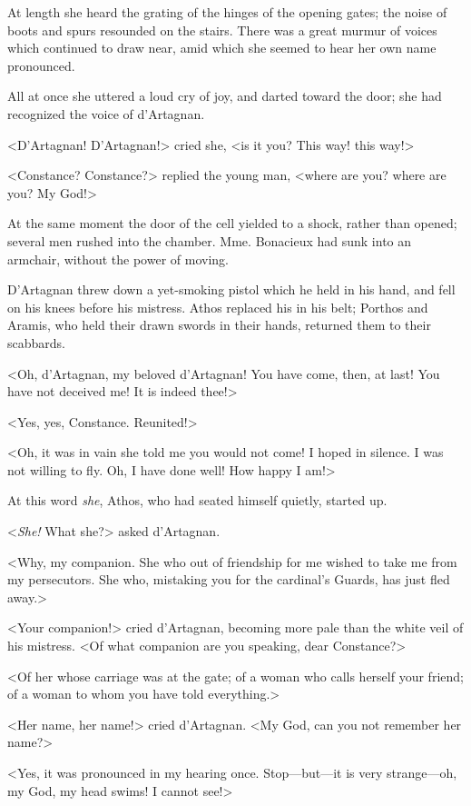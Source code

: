 At length she heard the grating of the hinges of the opening gates; the noise of boots and spurs resounded on the stairs. There was a great murmur of voices which continued to draw near, amid which she seemed to hear her own name pronounced. 

All at once she uttered a loud cry of joy, and darted toward the door; she had recognized the voice of d'Artagnan. 

<D'Artagnan! D'Artagnan!> cried she, <is it you? This way! this way!> 

<Constance? Constance?> replied the young man, <where are you? where are you? My God!> 

At the same moment the door of the cell yielded to a shock, rather than opened; several men rushed into the chamber. Mme. Bonacieux had sunk into an armchair, without the power of moving. 

D'Artagnan threw down a yet-smoking pistol which he held in his hand, and fell on his knees before his mistress. Athos replaced his in his belt; Porthos and Aramis, who held their drawn swords in their hands, returned them to their scabbards. 

<Oh, d'Artagnan, my beloved d'Artagnan! You have come, then, at last! You have not deceived me! It is indeed thee!> 

<Yes, yes, Constance. Reunited!> 

<Oh, it was in vain she told me you would not come! I hoped in silence. I was not willing to fly. Oh, I have done well! How happy I am!> 

At this word \textit{she}, Athos, who had seated himself quietly, started up. 

<\textit{She!} What she?> asked d'Artagnan. 

<Why, my companion. She who out of friendship for me wished to take me from my persecutors. She who, mistaking you for the cardinal's Guards, has just fled away.> 

<Your companion!> cried d'Artagnan, becoming more pale than the white veil of his mistress. <Of what companion are you speaking, dear Constance?> 

<Of her whose carriage was at the gate; of a woman who calls herself your friend; of a woman to whom you have told everything.> 

<Her name, her name!> cried d'Artagnan. <My God, can you not remember her name?> 

<Yes, it was pronounced in my hearing once. Stop---but---it is very strange---oh, my God, my head swims! I cannot see!> 

